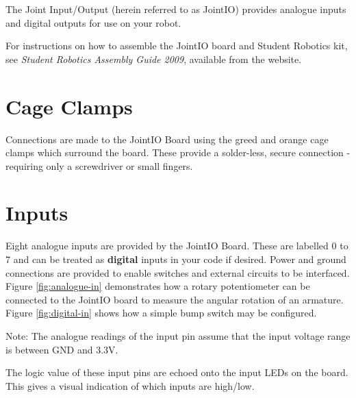 \documentclass[a4paper, 12pt]{article}
\begin{document}
The Joint Input/Output (herein referred to as JointIO) provides analogue inputs and digital outputs for use on your robot.  

For instructions on how to assemble the JointIO board and Student Robotics kit, see \textit{Student Robotics Assembly Guide 2009}, available from the website.


\section{Cage Clamps}
Connections are made to the JointIO Board using the greed and orange cage clamps which surround the board. These provide a solder-less, secure connection - requiring only a screwdriver or small fingers. 

\section{Inputs}
Eight analogue inputs are provided by the JointIO Board. These are labelled 0 to 7 and can be treated as \textbf{digital} inputs in your code if desired. Power and ground connections are provided to enable switches and external circuits to be interfaced. Figure \ref{fig:analogue-in} demonstrates how a rotary potentiometer can be connected to the JointIO board to measure the angular rotation of an armature. Figure \ref{fig:digital-in} shows how a simple bump switch may be configured.

Note: The analogue readings of the input pin assume that the input voltage range is between GND and 3.3V. 

The logic value of these input pins are echoed onto the input LEDs on the board. This gives a visual indication of which inputs are high/low.
\end{document}
